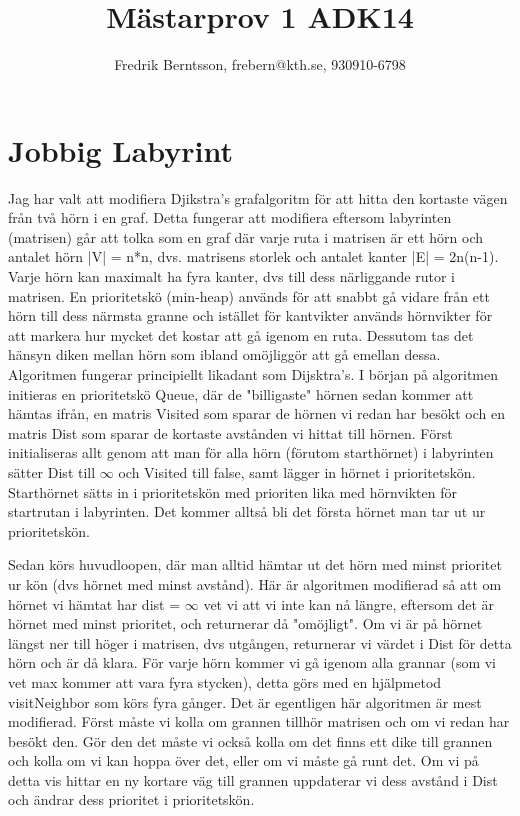 \documentclass[a4paper]{article}
\title{Mästarprov 1 ADK14}
\author{Fredrik Berntsson, frebern@kth.se, 930910-6798}
\begin{document}
\maketitle

\section{Jobbig Labyrint}
Jag har valt att modifiera Djikstra's grafalgoritm för att hitta den kortaste vägen från två hörn i en graf. Detta fungerar att modifiera eftersom labyrinten (matrisen) går att tolka som en graf där varje ruta i matrisen är ett hörn och antalet hörn |V| = n*n, dvs. matrisens storlek och antalet kanter |E| = 2n(n-1). Varje hörn kan maximalt ha fyra kanter, dvs till dess närliggande rutor i matrisen. En prioritetskö (min-heap) används för att snabbt gå vidare från ett hörn till dess närmsta granne och istället för kantvikter används hörnvikter för att markera hur mycket det kostar att gå igenom en ruta. Dessutom tas det hänsyn diken mellan hörn som ibland omöjliggör att gå emellan dessa.
\newline \newline Algoritmen fungerar principiellt likadant som Dijsktra's. I början på algoritmen initieras en prioritetskö Queue, där de "billigaste" hörnen sedan kommer att hämtas ifrån, en matris Visited som sparar de hörnen vi redan har besökt och en matris Dist som sparar de kortaste avstånden vi hittat till hörnen.
Först initialiseras allt genom att man för alla hörn (förutom starthörnet) i labyrinten sätter Dist till $\infty$ och Visited till false, samt lägger in hörnet i prioritetskön. Starthörnet sätts in i prioritetskön med prioriten lika med hörnvikten för startrutan i labyrinten. Det kommer alltså bli det första hörnet man tar ut ur prioritetskön.

Sedan körs huvudloopen, där man alltid hämtar ut det hörn med minst prioritet ur kön (dvs hörnet med minst avstånd). Här är algoritmen modifierad så att om hörnet vi hämtat har dist = $\infty$ vet vi att vi inte kan nå längre, eftersom det är hörnet med minst prioritet,  och returnerar då "omöjligt". Om vi är på hörnet längst ner till höger i matrisen, dvs utgången, returnerar vi värdet i Dist för detta hörn och är då klara.
För varje hörn kommer vi gå igenom alla grannar (som vi vet max kommer att vara fyra stycken), detta görs med en hjälpmetod visitNeighbor som körs fyra gånger. Det är egentligen här algoritmen är mest modifierad. Först måste vi kolla om grannen tillhör matrisen och om vi redan har besökt den. Gör den det måste vi också kolla om det finns ett dike till grannen och kolla om vi kan hoppa över det, eller om vi måste gå runt det. Om vi på detta vis hittar en ny kortare väg till grannen uppdaterar vi dess avstånd i Dist och ändrar dess prioritet i prioritetskön.
\end{document}
